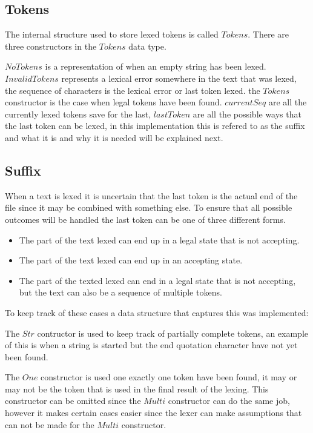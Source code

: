 \subsection{Tokens}
The internal structure used to store lexed tokens is called $Tokens$. There are
three constructors in the $Tokens$ data type.

$NoTokens$ is a representation of when an empty string has been lexed.
$InvalidTokens$ represents a lexical error somewhere in the text that was lexed,
the sequence of characters is the lexical error or last token lexed. the
$Tokens$ constructor is the case when legal tokens have been found. $currentSeq$
are all the currently lexed tokens save for the last, $lastToken$ are all the
possible ways that the last token can be lexed, in this implementation this is
refered to as the suffix and what it is and why it is needed will be explained
next.

\subsection{Suffix}
When a text is lexed it is uncertain that the last token is the actual end of
the file since it may be combined with something else. To ensure that all
possible outcomes will be handled the last token can be one of three different
forms.

\begin{itemize}
\item The part of the text lexed can end up in a legal state that is not
accepting.
\item The part of the text lexed can end up in an accepting state.
\item The part of the texted lexed can end in a legal state that is not
accepting, but the text can also be a sequence of multiple tokens.
\end{itemize}
To keep track of these cases a data structure that captures this was
implemented:

The $Str$ contructor is used to keep track of partially complete tokens, an
example of this is when a string is started but the end quotation character have
not yet been found.

The $One$ constructor is used one exactly one token have been found, it may or
may not be the token that is used in the final result of the lexing. This
constructor can be omitted since the $Multi$ constructor can do the same job,
however it makes certain cases easier since the lexer can make assumptions that
can not be made for the $Multi$ constructor.

